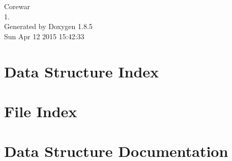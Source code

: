 \documentclass[twoside]{book}
\newcommand{\clearemptydoublepage}{%
  \newpage{\pagestyle{empty}\cleardoublepage}%
}
\begin{document}
\hypersetup{pageanchor=false}
\begin{titlepage}
\vspace*{7cm}
\begin{center}%
{\Large Corewar \\[1ex]\large 1. }\\
\vspace*{1cm}
{\large Generated by Doxygen 1.8.5}\\
\vspace*{0.5cm}
{\small Sun Apr 12 2015 15:42:33}\\
\end{center}
\end{titlepage}
\clearemptydoublepage
\tableofcontents
\clearemptydoublepage
{}
\hypersetup{pageanchor=true}

\chapter{Data Structure Index}

\chapter{File Index}

\chapter{Data Structure Documentation}











\end{document}

